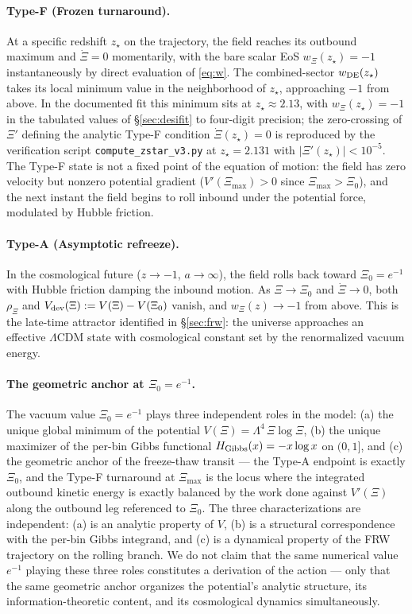\documentclass[11pt,reqno]{amsart}
\theoremstyle{plain}
\theoremstyle{definition}
\theoremstyle{remark}
\begin{document}
\paragraph{Type-F (Frozen turnaround).}
At a specific redshift $z_\star$ on the trajectory, the field reaches
its outbound maximum and $\dot\Xi = 0$ momentarily, with the bare
scalar EoS $w_\Xi(z_\star) = -1$ instantaneously by direct evaluation
of \eqref{eq:w}. The combined-sector $w_{\rm DE}(z_\star)$ takes its
local minimum value in the neighborhood of $z_\star$, approaching
$-1$ from above. In the documented fit this minimum sits at
$z_\star \approx 2.13$, with $w_\Xi(z_\star) = -1$ in the
tabulated values of \S\ref{sec:desifit} to four-digit precision; the
zero-crossing of $\Xi'$ defining the analytic Type-F condition
$\dot\Xi(z_\star) = 0$ is reproduced by the verification script
\texttt{compute\_zstar\_v3.py} at $z_\star = 2.131$ with
$|\Xi'(z_\star)| < 10^{-5}$. The Type-F state is
not a fixed point of the equation of motion: the field has zero
velocity but nonzero potential gradient ($V'(\Xi_{\max}) > 0$ since
$\Xi_{\max} > \Xi_0$), and the next instant the field begins to roll
inbound under the potential force, modulated by Hubble friction.

\paragraph{Type-A (Asymptotic refreeze).}
In the cosmological future ($z \to -1$, $a \to \infty$), the field
rolls back toward $\Xi_0 = e^{-1}$ with Hubble friction damping the
inbound motion. As $\Xi \to \Xi_0$ and $\dot\Xi \to 0$, both $\rho_\Xi$
and $V_{\rm dev}(\Xi) := V(\Xi) - V(\Xi_0)$ vanish, and $w_\Xi(z) \to -1$
from above. This is the late-time attractor identified in
\S\ref{sec:frw}: the universe approaches an effective $\Lambda$CDM
state with cosmological constant set by the renormalized vacuum
energy.

\paragraph{The geometric anchor at $\Xi_0 = e^{-1}$.}
The vacuum value $\Xi_0 = e^{-1}$ plays three independent roles in the
model: (a) the unique global minimum of the potential
$V(\Xi) = \Lambda^4\,\Xi\log\Xi$, (b) the unique maximizer of the
per-bin Gibbs functional $H_{\rm Gibbs}(x) = -x\log x$ on $(0, 1]$, and
(c) the geometric anchor of the freeze-thaw transit --- the Type-A
endpoint is exactly $\Xi_0$, and the Type-F turnaround at $\Xi_{\max}$
is the locus where the integrated outbound kinetic energy is exactly
balanced by the work done against $V'(\Xi)$ along the outbound leg
referenced to $\Xi_0$. The three characterizations are independent:
(a) is an analytic property of $V$, (b) is a structural correspondence
with the per-bin Gibbs integrand, and (c) is a dynamical property of
the FRW trajectory on the rolling branch. We do not claim that the
same numerical value $e^{-1}$ playing these three roles constitutes a
derivation of the action --- only that the same geometric anchor
organizes the potential's analytic structure, its information-theoretic
content, and its cosmological dynamics simultaneously.
\end{document}
